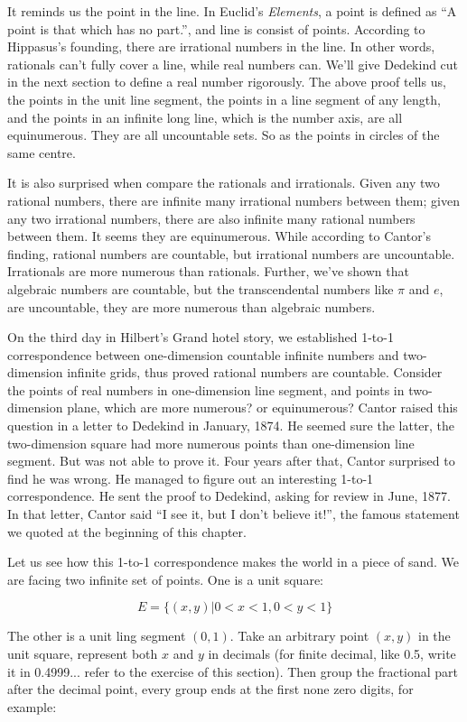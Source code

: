 \documentclass{article}
\begin{document}
It reminds us the point in the line. In Euclid's {\em Elements}, a point is defined as ``A point is that which has no part.'', and line is consist of points. According to Hippasus's founding, there are irrational numbers in the line. In other words, rationals can't fully cover a line, while real numbers can. We'll give Dedekind cut in the next section to define a real number rigorously. The above proof tells us, the points in the unit line segment, the points in a line segment of any length, and the points in an infinite long line, which is the number axis, are all equinumerous. They are all uncountable sets. So as the points in circles of the same centre.

It is also surprised when compare the rationals and irrationals. Given any two rational numbers, there are infinite many irrational numbers between them; given any two irrational numbers, there are also infinite many rational numbers between them. It seems they are equinumerous. While according to Cantor's finding, rational numbers are countable, but irrational numbers are uncountable. Irrationals are more numerous than rationals. Further, we've shown that algebraic numbers are countable, but the transcendental numbers like $\pi$ and $e$, are uncountable, they are more numerous than algebraic numbers.

On the third day in Hilbert's Grand hotel story, we established 1-to-1 correspondence between one-dimension countable infinite numbers and two-dimension infinite grids, thus proved rational numbers are countable. Consider the points of real numbers in one-dimension line segment, and points in two-dimension plane, which are more numerous? or equinumerous? Cantor raised this question in a letter to Dedekind in January, 1874. He seemed sure the latter, the two-dimension square had more numerous points than one-dimension line segment. But was not able to prove it. Four years after that, Cantor surprised to find he was wrong. He managed to figure out an interesting 1-to-1 correspondence. He sent the proof to Dedekind, asking for review in June, 1877. In that letter, Cantor said ``I see it, but I don't believe it!'', the famous statement we quoted at the beginning of this chapter.

Let us see how this 1-to-1 correspondence makes the world in a piece of sand. We are facing two infinite set of points. One is a unit square:

\[
E = \{ (x, y) | 0 < x < 1, 0 < y < 1\}
\]

The other is a unit ling segment $(0, 1)$. Take an arbitrary point $(x, y)$ in the unit square, represent both $x$ and $y$ in decimals (for finite decimal, like 0.5, write it in 0.4999... refer to the exercise of this section). Then group the fractional part after the decimal point, every group ends at the first none zero digits, for example:
\end{document}

